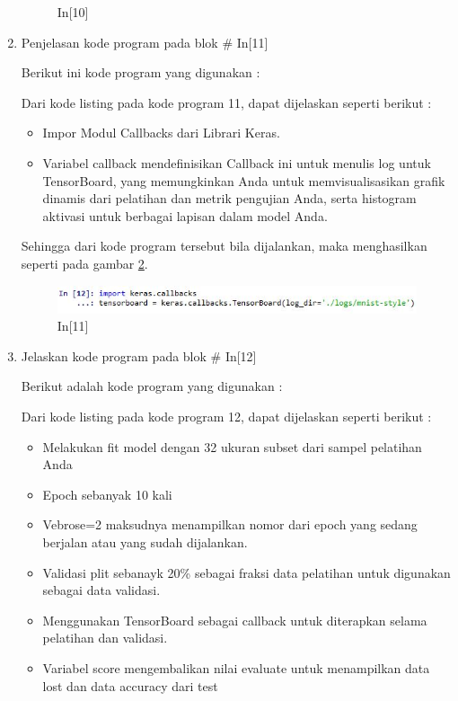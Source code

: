 \begin{enumerate}
\begin{figure}[!htbp]
\caption{In[10]}
\label{c7t_17}
\end{figure}
\item Penjelasan kode program pada blok \# In[11]
\par Berikut ini kode program yang digunakan :

\par Dari kode listing pada kode program 11, dapat dijelaskan seperti berikut :
\begin{itemize}
\item Impor Modul Callbacks dari Librari Keras.
\item Variabel callback mendefinisikan Callback ini untuk menulis log untuk TensorBoard, yang memungkinkan Anda untuk memvisualisasikan grafik dinamis dari pelatihan dan metrik pengujian Anda, serta histogram aktivasi untuk berbagai lapisan dalam model Anda.
\end{itemize}
\par Sehingga dari kode program tersebut bila dijalankan, maka menghasilkan seperti pada gambar \ref{c7t_18}.
\begin{figure}[!htbp]
\centerline{\includegraphics[width=1\textwidth]{figures/c7t/18.JPG}}
\caption{In[11]}
\label{c7t_18}
\end{figure}
\item Jelaskan kode program pada blok \# In[12]
\par Berikut adalah kode program yang digunakan :

\par Dari kode listing pada kode program 12, dapat dijelaskan seperti berikut :
\begin{itemize}
\item Melakukan fit model dengan 32 ukuran subset dari sampel pelatihan Anda
\item Epoch sebanyak 10 kali
\item Vebrose=2 maksudnya menampilkan nomor dari epoch yang sedang berjalan atau yang sudah dijalankan.
\item Validasi plit sebanayk 20\% sebagai fraksi data pelatihan untuk digunakan sebagai data validasi.
\item Menggunakan TensorBoard sebagai callback untuk diterapkan selama pelatihan dan validasi.
\item Variabel score mengembalikan nilai evaluate untuk menampilkan data lost dan data accuracy dari test

\end{itemize}
\end{enumerate}
